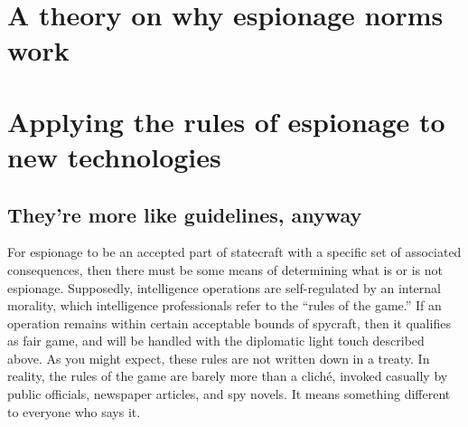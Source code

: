 \documentclass{report}
\begin{document}
\section{A theory on why espionage norms work}



\section{Applying the rules of espionage to new technologies}
\subsection{They're more like guidelines, anyway}
For espionage to be an accepted part of statecraft with a specific set of associated consequences, then there must be some means of determining what is or is not espionage. Supposedly, intelligence operations are self-regulated by an internal morality, which intelligence professionals refer to the ``rules of the game.'' If an operation remains within certain acceptable bounds of spycraft, then it qualifies as fair game, and will be handled with the diplomatic light touch described above. As you might expect, these rules are not written down in a treaty. In reality, the rules of the game are barely more than a clich\'e, invoked casually by public officials, newspaper articles, and spy novels. It means something different to everyone who says it.
\end{document}
